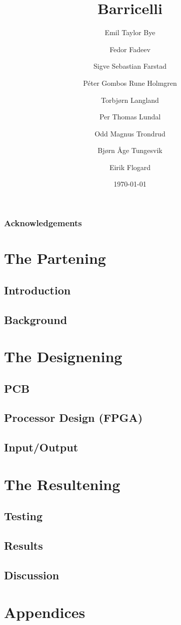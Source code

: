 \documentclass{report}
\title{Barricelli}
\date{\today}
\author{Emil Taylor Bye
     \and Fedor Fadeev
     \and Sigve Sebastian Farstad
     \and Péter Gombos Rune Holmgren
     \and Torbjørn Langland
     \and Per Thomas Lundal
     \and Odd Magnus Trondrud
     \and Bjørn Åge Tungesvik
     \and Eirik Flogard
}
\begin{document}
\maketitle

\begin{abstract}
	
\end{abstract}

\tableofcontents

\section{Acknowledgements}

\part{The Partening}

\chapter{Introduction}
	

\chapter{Background}
	

\part{The Designening}

\chapter{PCB}
	

\chapter{Processor Design (FPGA)}
	

\chapter{Input/Output}
	

\part{The Resultening}

\chapter{Testing}
	

\chapter{Results}
	

\chapter{Discussion}
	

\part{Appendices}
	



\nocite{*}
\end{document}
